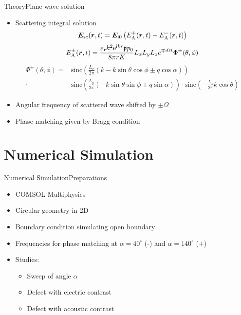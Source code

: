 \documentclass[11pt, final]{beamer}
\begin{document}
	\begin{frame}{Theory}{Plane wave solution}
		\begin{itemize}
			\item Scattering integral solution
			\small
			\begin{equation*}
				\bm{E}_{\mathrm{sc}} (\bm{r},t) = \bm{E}_{\mathrm{i}0} \left( E_{\mathrm{A}}^+ (\bm{r},t) + E_{\mathrm{A}}^- (\bm{r},t) \right)
			\end{equation*}
			\begin{equation*}
				E_{\mathrm{A}}^\pm (\bm{r},t) = \frac{\varepsilon_{\mathrm{r}}k^2 \mathrm{e}^{\mathrm{i} kr} \mathfrak{p} p_0}{8\pi r K} L_{x} L_{y} L_{z} e^{\mp \mathrm{i} \Omega t} \Phi^\pm (\theta,\phi)
			\end{equation*}
			\begin{equation*}
			\begin{split}
				\Phi^\pm(\theta,\phi) =& \text{sinc} \left( \frac{L_{x}}{2\pi} \left( k - k\sin{\theta}\cos{\phi} \pm q\cos{\alpha} \right) \right) \\
				\cdot& \text{sinc} \left( \frac{L_{y}}{2\pi} \left( -k\sin{\theta}\sin{\phi} \pm q\sin{\alpha} \right) \right)
				\cdot \text{sinc} \left( -\frac{L_{z}}{2\pi} k\cos{\theta} \right)
			\end{split}
			\end{equation*}
			\pause
			\normalsize
			\item Angular frequency of scattered wave shifted by $\pm \Omega$
			\item Phase matching given by Bragg condition
		\end{itemize}
	\end{frame}

	\section{Numerical Simulation}
	
	\begin{frame}{Numerical Simulation}{Preparations}
		\begin{itemize}
			\item COMSOL Multiphysics
			\pause
			\item Circular geometry in 2D
			\item Boundary condition simulating open boundary
			\pause
			\item Frequencies for phase matching at $\alpha = 40^\circ$ (-) and $\alpha = 140^\circ$ (+)
			\pause
			\item Studies:
			\begin{itemize}
				\item Sweep of angle $\alpha$
				\item Defect with electric contrast
				\item Defect with acoustic contrast
			\end{itemize}
		\end{itemize}
	\end{frame}
	
\end{document}
